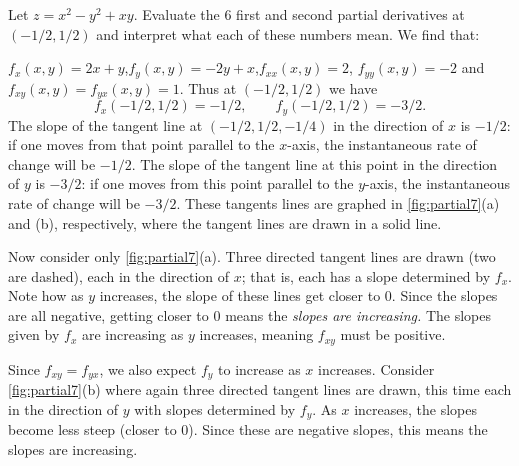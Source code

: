 \begin{example}\label{ex_partial7}
Let $z=x^2-y^2+xy$. Evaluate the 6 first and second partial derivatives at $(-1/2,1/2)$ and interpret what each of these numbers mean.
\solution
We find that:

$f_x(x,y) = 2x+y$,\quad  $f_y(x,y) = -2y+x$,\quad $f_{xx}(x,y) = 2$, \quad $f_{yy}(x,y) = -2$ and $f_{xy}(x,y) = f_{yx}(x,y) = 1$. Thus at $(-1/2,1/2)$ we have 
\[f_x(-1/2,1/2) = -1/2,\qquad f_y(-1/2,1/2) = -3/2.\]
The slope of the tangent line at $(-1/2, 1/2, -1/4)$ in the direction of $x$ is $-1/2$: if one moves from that point parallel to the $x$-axis, the instantaneous rate of change will be $-1/2$. The slope of the tangent line at this point in the direction of $y$ is $-3/2$: if one moves from this point parallel to the $y$-axis, the instantaneous rate of change will be $-3/2$. These tangents lines are graphed in \autoref{fig:partial7}(a) and (b), respectively, where the tangent lines are drawn in a solid line. 


Now consider only \autoref{fig:partial7}(a). Three directed tangent lines are drawn (two are dashed), each in the direction of $x$; that is, each has a slope determined by $f_x$. Note how as $y$ increases, the slope of these lines get closer to $0$. Since the slopes are all negative, getting closer to 0 means the \emph{slopes are increasing.} The slopes given by $f_x$ are increasing as $y$ increases, meaning $f_{xy}$ must be positive. 

Since $f_{xy}=f_{yx}$, we also expect $f_y$ to increase as $x$ increases. Consider \autoref{fig:partial7}(b) where again three directed tangent lines are drawn, this time each in the direction of $y$ with slopes determined by $f_y$. As $x$ increases, the slopes become less steep (closer to 0). Since these are negative slopes, this means the slopes are increasing.


\end{example}

